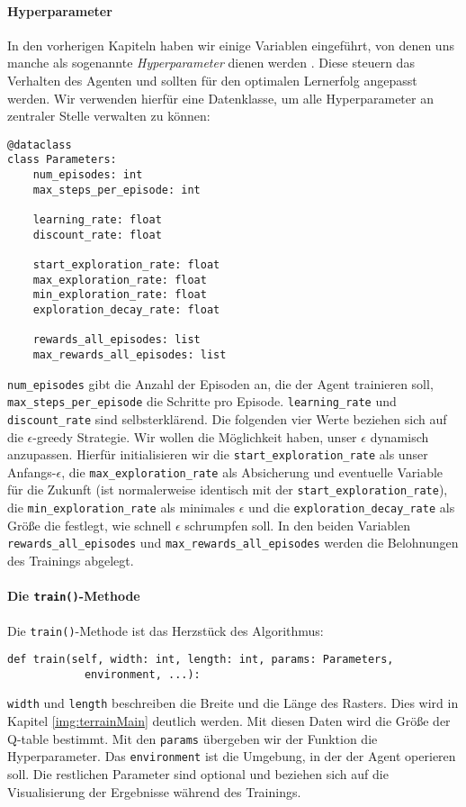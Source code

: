 \paragraph{Hyperparameter} \label{sec:qLearningHyperparameter}
In den vorherigen Kapiteln haben wir einige Variablen eingeführt, von denen uns manche als sogenannte \textit{Hyperparameter} dienen werden \cite{08_ravichandiran2018hands}. Diese steuern das Verhalten des Agenten und sollten für den optimalen Lernerfolg angepasst werden. Wir verwenden hierfür eine Datenklasse, um alle Hyperparameter an zentraler Stelle verwalten zu können:
\begin{verbatim}
@dataclass
class Parameters:
    num_episodes: int
    max_steps_per_episode: int

    learning_rate: float
    discount_rate: float

    start_exploration_rate: float
    max_exploration_rate: float
    min_exploration_rate: float
    exploration_decay_rate: float

    rewards_all_episodes: list
    max_rewards_all_episodes: list
\end{verbatim}
\texttt{num_episodes} gibt die Anzahl der Episoden an, die der Agent trainieren soll, \linebreak\texttt{max_steps_per_episode} die Schritte pro Episode. \texttt{learning_rate} und \texttt{discount_rate} sind selbsterklärend. Die folgenden vier Werte beziehen sich auf die $ \epsilon $-greedy Strategie. Wir wollen die Möglichkeit haben, unser $ \epsilon $ dynamisch anzupassen. Hierfür initialisieren wir die \texttt{start_exploration_rate} als unser Anfangs-$ \epsilon $, die \texttt{max_exploration_rate} als Absicherung und eventuelle Variable für die Zukunft (ist normalerweise identisch mit der \texttt{start_exploration_rate}), die \texttt{min_exploration_rate} als minimales $ \epsilon $ und die \texttt{exploration_decay_rate} als Größe die festlegt, wie schnell $ \epsilon $ schrumpfen soll. In den beiden Variablen \texttt{rewards_all_episodes} und \texttt{max_rewards_all_episodes} werden die Belohnungen des Trainings abgelegt.

\paragraph{Die \texttt{train()}-Methode}
Die \texttt{train()}-Methode ist das Herzstück des Algorithmus:
\begin{verbatim}
def train(self, width: int, length: int, params: Parameters,
            environment, ...):
\end{verbatim}
\texttt{width} und \texttt{length} beschreiben die Breite und die Länge des Rasters. Dies wird in Kapitel \ref{img:terrainMain} deutlich werden. Mit diesen Daten wird die Größe der Q-table bestimmt. Mit den \texttt{params} übergeben wir der Funktion die Hyperparameter. Das \texttt{environment} ist die Umgebung, in der der Agent operieren soll. Die restlichen Parameter sind optional und beziehen sich auf die Visualisierung der Ergebnisse während des Trainings.

